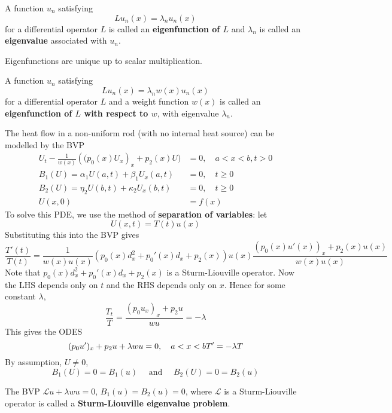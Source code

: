 \begin{definition}
	A function $u_n$ satisfying
	\[
		L u_n(x) = \lambda_n u_n(x)
	\]
	for a differential operator $L$ is called an \textbf{eigenfunction of $L$} and $\lambda_n$ is called an \textbf{eigenvalue} associated with $u_n$.
\end{definition}

\begin{remark}
	Eigenfunctions are unique up to scalar multiplication.
\end{remark}

\begin{definition}
	A function $u_n$ satisfying
	\[
		L u_n (x) = \lambda_n w(x) u_n(x)
	\]
	for a differential operator $L$ and a weight function $w(x)$ is called an \textbf{eigenfunction of $L$ with respect to $w$}, with eigenvalue $\lambda_n$.
\end{definition}

\begin{example}
	The heat flow in a non-uniform rod (with no internal heat source) can be modelled by the BVP
	\[
		\begin{aligned}
			U_t - \frac{1}{w(x)} ({(p_0(x) U_x})_x + p_2(x) U) & = 0, \quad a < x < b, t > 0 \\
			B_1(U) = \alpha_1 U(a, t) + \beta_1 U_x(a, t) & = 0, \quad t \ge 0 \\
			B_2(U) = \eta_2 U(b, t) + \kappa_2 U_x(b, t) & = 0, \quad t \ge 0 \\
			U(x, 0) & = f(x)
		\end{aligned}
	\]
	To solve this PDE, we use the method of \textbf{separation of variables}: let
	\[
		U(x, t) = T(t) u(x)
	\]
	Substituting this into the BVP gives
	\[
		\frac{T'(t)}{T(t)} = \frac{1}{w(x) u(x)} (p_0(x) d_x^2 + p_0'(x) d_x + p_2(x)) u(x) \frac{{(p_0(x) u'(x))}_x + p_2(x) u(x)}{w(x) u(x)}
	\]
	Note that $p_0(x) d_x^2 + p_0'(x) d_x + p_2(x)$ is a Sturm-Liouville operator. Now the LHS depends only on $t$ and the RHS depends only on $x$. Hence for some constant $\lambda$,
	\[
		\frac{T_t}{T} = \frac{{(p_0 u_x)}_x + p_2 u}{w u} = -\lambda
	\]
	This gives the ODES
	\[
		(p_0 u')_x + p_2 u + \lambda w u = 0, \quad a < x < b \\
		T' = -\lambda T
	\]
	By assumption, $U \ne 0$,
	\[
		B_1(U) = 0 = B_1(u) \quad \text{ and } \quad B_2(U) = 0 = B_2(u)
	\]
\end{example}

\begin{definition}
	The BVP $\mathcal{L} u + \lambda w u = 0$, $B_1(u) = B_2(u) = 0$, where $\mathcal{L}$ is a Sturm-Liouville operator is called a \textbf{Sturm-Liouville eigenvalue problem}.
\end{definition}

